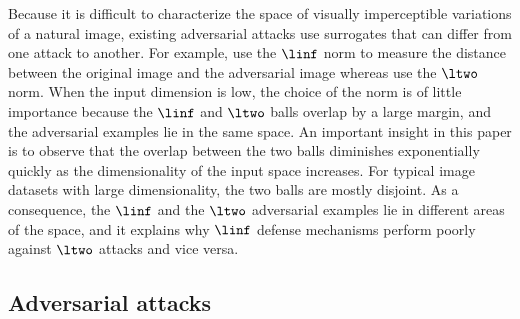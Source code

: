 Because it is difficult to characterize the space of visually imperceptible variations of a natural image, existing adversarial attacks use surrogates that can differ from one attack to another.
For example, \citet{goodfellow2014explaining} use the $\linf$ norm to measure the distance between the original image and the adversarial image whereas \citet{carlini2017towards} use the $\ltwo$ norm.
When the input dimension is low, the choice of the norm is of little importance because the $\linf$ and $\ltwo$ balls overlap by a large margin, and the adversarial examples lie in the same space.
An important insight in this paper is to observe that the overlap between the two balls  diminishes exponentially quickly as the dimensionality of the input space increases.
For typical image datasets with large dimensionality, the two balls are mostly disjoint.
As a consequence, the $\linf$ and the $\ltwo$ adversarial examples lie in different areas of the space, and it explains why $\linf$ defense mechanisms perform poorly against $\ltwo$ attacks and vice versa. 




\subsection{Adversarial attacks}
\label{subsection:ch6-adversarial_attacks}
 
